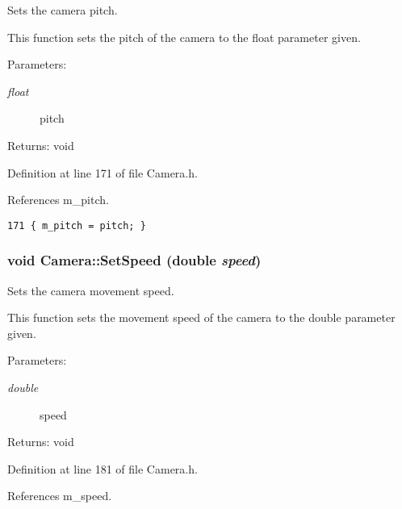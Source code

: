 Sets the camera pitch. 

This function sets the pitch of the camera to the float parameter given.

\begin{Desc}
\item[Parameters:]
\begin{description}
\item[{\em float}]pitch \end{description}
\end{Desc}
\begin{Desc}
\item[Returns:]void \end{Desc}


Definition at line 171 of file Camera.h.

References m\_\-pitch.

\begin{Code}\begin{verbatim}171 { m_pitch = pitch; }
\end{verbatim}
\end{Code}


\hypertarget{class_camera_8cb555aeca85fcd988978105178cc0f3}{
\subsubsection[SetSpeed]{\setlength{\rightskip}{0pt plus 5cm}void Camera::SetSpeed (double {\em speed})}}
\label{class_camera_8cb555aeca85fcd988978105178cc0f3}


Sets the camera movement speed. 

This function sets the movement speed of the camera to the double parameter given.

\begin{Desc}
\item[Parameters:]
\begin{description}
\item[{\em double}]speed \end{description}
\end{Desc}
\begin{Desc}
\item[Returns:]void \end{Desc}


Definition at line 181 of file Camera.h.

References m\_\-speed.

